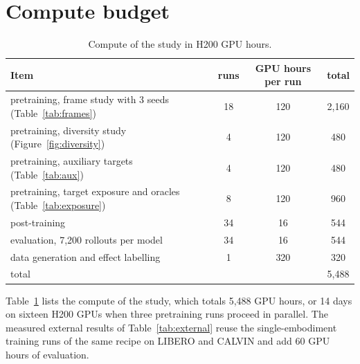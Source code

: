 \section{Compute budget}
\label{app:compute}

\begin{table}[h]
\centering
\caption{Compute of the study in H200 GPU hours.}
\label{tab:compute}
\small
\begin{tabular}{lccc}
\toprule
Item & runs & GPU hours per run & total \\
\midrule
pretraining, frame study with 3 seeds (Table~\ref{tab:frames}) & 18 & 120 & 2{,}160 \\
pretraining, diversity study (Figure~\ref{fig:diversity}) & 4 & 120 & 480 \\
pretraining, auxiliary targets (Table~\ref{tab:aux}) & 4 & 120 & 480 \\
pretraining, target exposure and oracles (Table~\ref{tab:exposure}) & 8 & 120 & 960 \\
post-training & 34 & 16 & 544 \\
evaluation, 7{,}200 rollouts per model & 34 & 16 & 544 \\
data generation and effect labelling & 1 & 320 & 320 \\
\midrule
total & & & 5{,}488 \\
\bottomrule
\end{tabular}
\end{table}

Table~\ref{tab:compute} lists the compute of the study, which totals 5{,}488 GPU hours, or 14 days on sixteen H200 GPUs when three pretraining runs proceed in parallel. The measured external results of Table~\ref{tab:external} reuse the single-embodiment training runs of the same recipe on LIBERO and CALVIN and add 60 GPU hours of evaluation.
